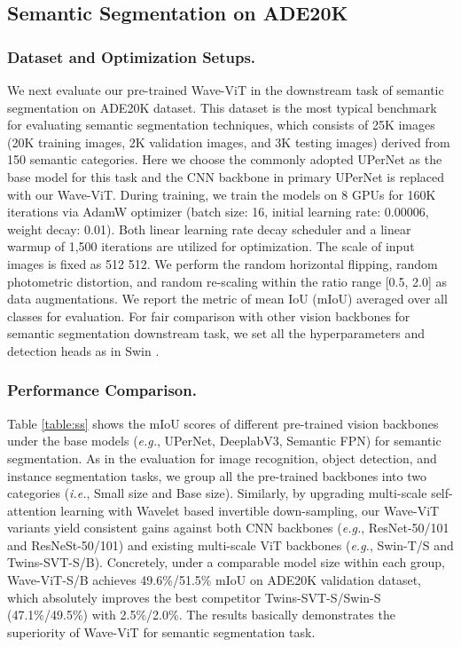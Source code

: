 \documentclass[runningheads]{llncs}
\begin{document}
\subsection{Semantic Segmentation on ADE20K}
\subsubsection{Dataset and Optimization Setups.}
We next evaluate our pre-trained Wave-ViT in the downstream task of semantic segmentation on ADE20K dataset. This dataset is the most typical benchmark for evaluating semantic segmentation techniques, which consists of 25K images (20K training images, 2K validation images, and 3K testing images) derived from 150 semantic categories. Here we choose the commonly adopted UPerNet \cite{xiao2018unified} as the base model for this task and the CNN backbone in primary UPerNet is replaced with our Wave-ViT. During training, we train the models on 8 GPUs for 160K iterations via AdamW \cite{loshchilov2017decoupled} optimizer (batch size: 16, initial learning rate: 0.00006, weight decay: 0.01). Both linear learning rate decay scheduler and a linear warmup of 1,500 iterations are utilized for optimization. The scale of input images is fixed as 512  512. We perform the random horizontal flipping, random photometric distortion, and random re-scaling within the ratio range [0.5, 2.0] as data augmentations. We report the metric of mean IoU (mIoU) averaged over all classes for evaluation. For fair comparison with other vision backbones for semantic segmentation downstream task, we set all the hyperparameters and detection heads as in Swin \cite{liu2021swin}.

\subsubsection{Performance Comparison.}

Table \ref{table:ss} shows the mIoU scores of different pre-trained vision backbones under the base models (\emph{e.g.}, UPerNet, DeeplabV3, Semantic FPN) for semantic segmentation. As in the evaluation for image recognition, object detection, and instance segmentation tasks, we group all the pre-trained backbones into two categories (\emph{i.e.}, Small size and Base size). Similarly, by upgrading multi-scale self-attention learning with Wavelet based invertible down-sampling, our Wave-ViT variants yield consistent gains against both CNN backbones (\emph{e.g.}, ResNet-50/101 and ResNeSt-50/101) and existing multi-scale ViT backbones (\emph{e.g.}, Swin-T/S and Twins-SVT-S/B). Concretely, under a comparable model size within each group, Wave-ViT-S/B achieves 49.6\%/51.5\% mIoU on ADE20K validation dataset, which absolutely improves the best competitor Twins-SVT-S/Swin-S (47.1\%/49.5\%) with 2.5\%/2.0\%. The results basically demonstrates the superiority of Wave-ViT for semantic segmentation task.
\end{document}
